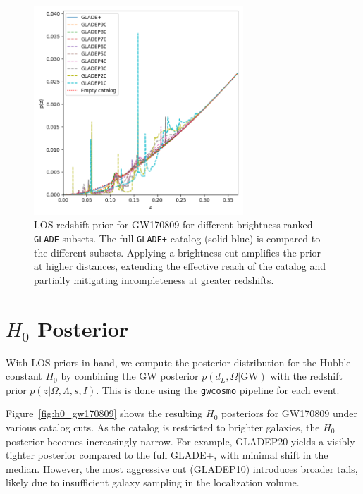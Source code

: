 \begin{figure}[ht]
    \centering
    \includegraphics[width=0.7\textwidth]{figures/GW170809_zprior.png}
    \caption[LOS redshift prior for GW170809 for different brightness-ranked \texttt{GLADE} subsets]{LOS redshift prior for GW170809 for different brightness-ranked \texttt{GLADE} subsets. The full \texttt{GLADE+} catalog (solid blue) is compared to the different subsets. Applying a brightness cut amplifies the prior at higher distances, extending the effective reach of the catalog and partially mitigating incompleteness at greater redshifts.}
    \label{fig:los_prior_gw170809}
\end{figure}

\section{$H_0$ Posterior}

With \ac{LOS} priors in hand, we compute the posterior distribution for the Hubble constant $H_0$ by combining the GW posterior $p(d_L, \Omega | \text{GW})$ with the redshift prior $p(z | \Omega, \Lambda, s, I)$. This is done using the \texttt{gwcosmo} pipeline for each event.

Figure~\ref{fig:h0_gw170809} shows the resulting $H_0$ posteriors for GW170809 under various catalog cuts. As the catalog is restricted to brighter galaxies, the $H_0$ posterior becomes increasingly narrow. For example, GLADEP20 yields a visibly tighter posterior compared to the full GLADE+, with minimal shift in the median. However, the most aggressive cut (GLADEP10) introduces broader tails, likely due to insufficient galaxy sampling in the localization volume.

